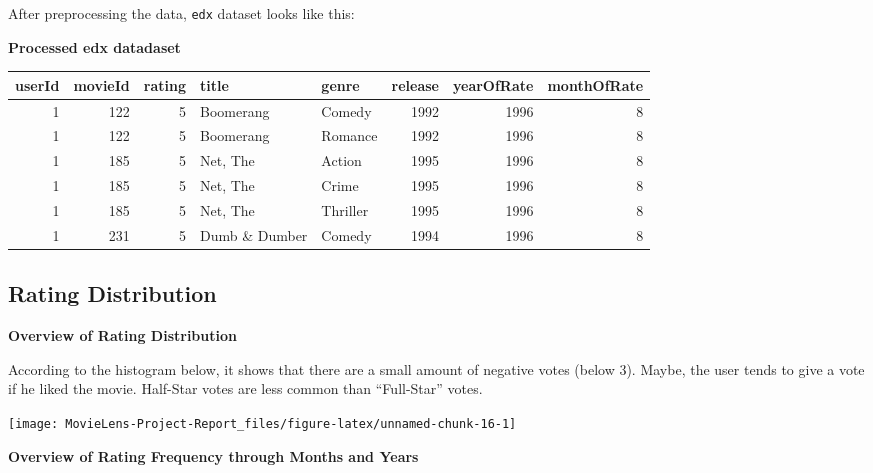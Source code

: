 \documentclass[
]{article}
\begin{document}
After preprocessing the data, \texttt{edx} dataset looks like this:

\textbf{Processed edx datadaset}

\begin{table}[!h]
\centering\begingroup\fontsize{10}{12}\selectfont

\begin{tabular}{r|r|r|l|l|r|r|r}
\hline
userId & movieId & rating & title & genre & release & yearOfRate & monthOfRate\\
\hline
1 & 122 & 5 & Boomerang & Comedy & 1992 & 1996 & 8\\
\hline
1 & 122 & 5 & Boomerang & Romance & 1992 & 1996 & 8\\
\hline
1 & 185 & 5 & Net, The & Action & 1995 & 1996 & 8\\
\hline
1 & 185 & 5 & Net, The & Crime & 1995 & 1996 & 8\\
\hline
1 & 185 & 5 & Net, The & Thriller & 1995 & 1996 & 8\\
\hline
1 & 231 & 5 & Dumb \& Dumber & Comedy & 1994 & 1996 & 8\\
\hline
\end{tabular}
\endgroup{}
\end{table}

\newpage

\hypertarget{rating-distribution}{%
\subsection{Rating Distribution}\label{rating-distribution}}

\textbf{Overview of Rating Distribution}

According to the histogram below, it shows that there are a small amount
of negative votes (below 3). Maybe, the user tends to give a vote if he
liked the movie. Half-Star votes are less common than ``Full-Star''
votes.

\begin{center}\texttt{[image: MovieLens-Project-Report\_files/figure-latex/unnamed-chunk-16-1]} \end{center}

\textbf{Overview of Rating Frequency through Months and Years}
\end{document}
